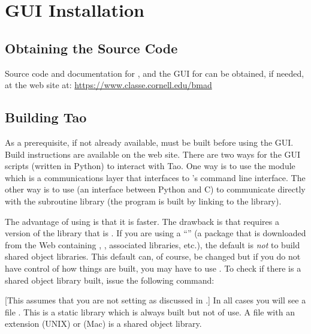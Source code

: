 \chapter{GUI Installation}
\label{s:gui.install}

\section{Obtaining the Source Code}

Source code and documentation for \bmad, \tao and the GUI for \tao can be obtained, if needed, at
the \bmad web site at:
  \hfill\break \hspace*{0.3in} \url{https://www.classe.cornell.edu/bmad}

\section{Building Tao}

As a prerequisite, if not already available, \tao must be built before using the GUI. Build
instructions are available on the \bmad web site. There are two ways for the GUI scripts (written in
Python) to interact with Tao. One way is to use the  module which is a communications
layer that interfaces to \tao's command line interface. The other way is to use  (an
interface between Python and C) to communicate directly with the \tao subroutine library (the \tao
program is built by linking to the \tao library). 

The advantage of using  is that it is faster. The drawback is that  requires a
version of the \tao library that is . If you are using a \bmad
``'' (a package that is downloaded from the Web containing \bmad, \tao, associated
libraries, etc.), the default is {\em not} to build shared object libraries. This default can, of
course, be changed but if you do not have control of how things are built, you may have to use
. To check if there is a shared object library built, issue the following command:
[This assumes that you are not setting  as discussed in .]
In all cases you will see a file . This is a static library which is always built but
not of use. A file with an extension  (UNIX) or  (Mac) is a shared object library. 

